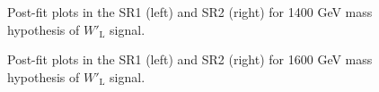 \begin{figure}[H]
  \centering
  \caption{Post-fit plots in the SR1 (left) and SR2 (right) for 1400 GeV mass hypothesis of $W'_{\text{L}}$ signal.}
  \label{fig:Postfit_WpLH1400_Asimov}
\end{figure}
\begin{figure}[H]
  \centering
  \caption{Post-fit plots in the SR1 (left) and SR2 (right) for 1600 GeV mass hypothesis of $W'_{\text{L}}$ signal.}
  \label{fig:Postfit_WpLH1600_Asimov}
\end{figure}
